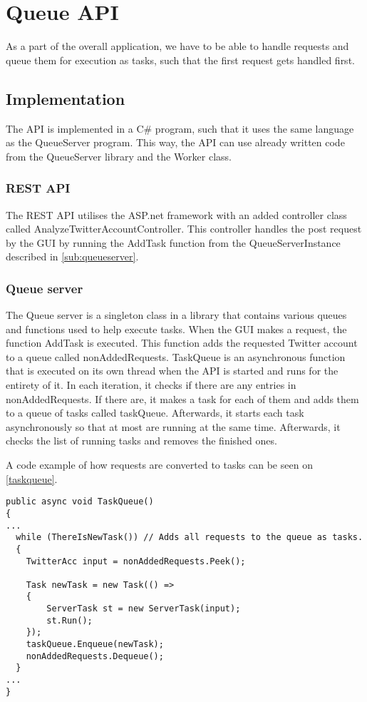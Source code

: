\chapter{Queue \ac{API}}
As a part of the overall application, we have to be able to handle requests
and queue them for execution as tasks, such that the first request gets handled
first.

\section{Implementation}
The \ac{API} is implemented in a C\# program, such that it uses the same
language as the QueueServer program. This way, the \ac{API} can use already
written code from the QueueServer library and the Worker class.

\subsection{\ac{REST} \ac{API}}
The \ac{REST} \ac{API} utilises the ASP.net framework with an added controller
class called AnalyzeTwitterAccountController. This controller handles the post
request by the GUI by running the AddTask function from the QueueServerInstance
described in \autoref{sub:queueserver}.

\subsection{Queue server} \label{sub:queueserver}
The Queue server is a singleton class in a library that contains various
queues and functions used to help execute tasks. When the GUI makes a request,
the function AddTask is executed. This function adds the requested Twitter
account to a queue called nonAddedRequests. TaskQueue is an asynchronous
function that is executed on its own thread when the \ac{API} is started and runs for
the entirety of it. In each iteration, it checks if there are any entries in
nonAddedRequests. If there are, it makes a task for each of them and adds them
to a queue of tasks called taskQueue. Afterwards, it starts each task
asynchronously so that at most 
are running at the same time. Afterwards, it checks the list of
running tasks and removes the finished ones. \nl

A code example of how requests are converted to tasks can be seen on
\autoref{taskqueue}. \\

\begin{minipage}[H]{\linewidth}
\begin{lstlisting}[caption = Adding tasks to the queue, label = taskqueue] 
public async void TaskQueue()
{
...
  while (ThereIsNewTask()) // Adds all requests to the queue as tasks.
  {
	TwitterAcc input = nonAddedRequests.Peek();
	
	Task newTask = new Task(() =>
	{
	    ServerTask st = new ServerTask(input);
	    st.Run();
	});
	taskQueue.Enqueue(newTask);
	nonAddedRequests.Dequeue();
  }
...  
}

\end{lstlisting}
\end{minipage}

